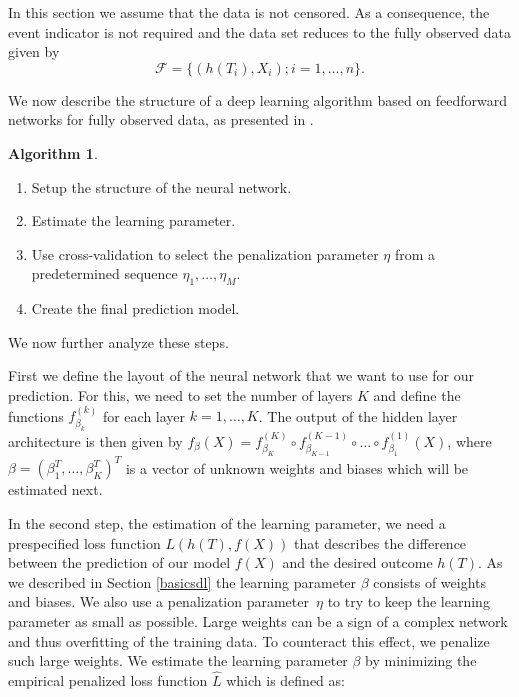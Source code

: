 \documentclass[12pt, a4paper]{scrartcl}
\theoremstyle{definition}
\newtheorem{Algorithm}{Algorithm}[section]
\theoremstyle{plain}
\numberwithin{equation}{section}
\numberwithin{figure}{section}
\numberwithin{table}{section}
\begin{document}
	In this section we assume that the data is not censored.
	As a consequence, the event indicator is not required and the data set reduces to the fully observed data given by
	\begin{equation*}
	\mathcal{F} =\{ \left( h(T_i), X_i\right); i = 1, \dots, n\}.
	\end{equation*}
	
	We now describe the structure of a deep learning algorithm based on feedforward networks for fully observed data, as presented in \citet*{basearticle}.
	
	\begin{Algorithm}\label{alg:nocensor}
		~
	\begin{enumerate}
		\item Setup the structure of the neural network.
		\item Estimate the learning parameter.
		\item Use cross-validation to select the penalization parameter $\eta$ from a predetermined sequence $\eta_1,\dots,\eta_M$.
		\item Create the final prediction model.
	\end{enumerate}
	\end{Algorithm}

	We now further analyze these steps.

	First we define the layout of the neural network that we want to use for our prediction.
	For this, we need to set the number of layers $K$ and define the functions $f_{\beta_k}^{(k)}$ for each layer $k = 1, \dots, K$.
	The output of the hidden layer architecture is then given by $f_{\beta}(X) = f_{\beta_K}^{(K)} \circ f_{\beta_{K-1}}^{(K-1)} \circ \dots \circ f_{\beta_1}^{(1)}(X)$, where $\beta = (\beta_1^T, \dots, \beta_K^T)^T$ is a vector of unknown weights and biases which will be estimated next.
	
	In the second step, the estimation of the learning parameter, we need a prespecified loss function $L(h(T), f(X))$ that describes the difference between the prediction of our model $f(X)$ and the desired outcome $h(T)$.
	As we described in Section \ref{basicsdl} the learning parameter $\beta$ consists of weights and biases.
	We also use a penalization parameter~$\eta$ to try to keep the learning parameter as small as possible.
	Large weights can be a sign of a complex network and thus overfitting of the training data.
	To counteract this effect, we penalize such large weights.
	We estimate the learning parameter $\beta$ by minimizing the empirical penalized loss function $\hat{L}$ which is defined as:
	
\end{document}

